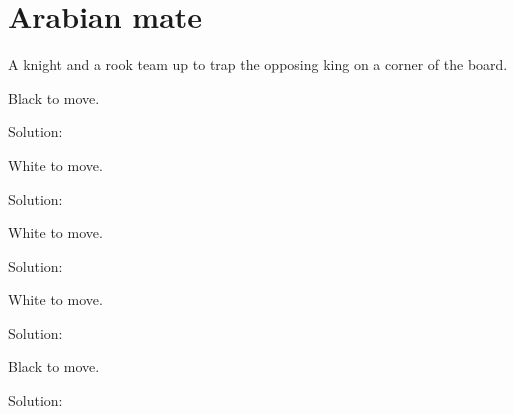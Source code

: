\documentclass{book}
\begin{document}
\section{Arabian mate}
A knight and a rook team up to trap the opposing king on a corner of the board.\begin{multicols}{2} 
\begin{samepage} 
\newgame 


 
\showboard
 
 Black to move. 
 
Solution: 
 
\end{samepage}\begin{samepage} 
\newgame 


 
\showboard
 
 White to move. 
 
Solution: 
 
\end{samepage}\begin{samepage} 
\newgame 


 
\showboard
 
 White to move. 
 
Solution: 
 
\end{samepage}\begin{samepage} 
\newgame 


 
\showboard
 
 White to move. 
 
Solution: 
 
\end{samepage}\begin{samepage} 
\newgame 


 
\showboard
 
 Black to move. 
 
Solution: 
 
\end{samepage}\end{multicols} 
\newpage 
\end{document}
